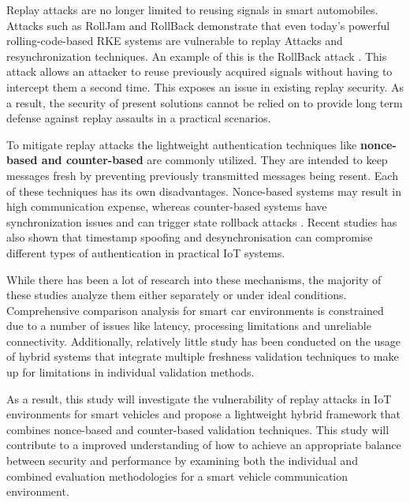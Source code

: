 \documentclass[a4paper,man,12pt]{article}
\begin{document}
Replay attacks are no longer limited to reusing signals in smart automobiles. Attacks such as RollJam and RollBack demonstrate that even today's powerful rolling-code-based RKE systems are vulnerable to replay Attacks and resynchronization techniques. An example of this is the RollBack attack \parencite{001B}. This attack allows an attacker to reuse previously acquired signals without having to intercept them a second time. This exposes an issue in existing replay security. As a result, the security of present solutions cannot be relied on to provide long term defense against replay assaults in a practical scenarios.\bigbreak

To mitigate replay attacks the lightweight authentication techniques like\textbf{ nonce-based and counter-based }are commonly utilized. They are intended to keep messages fresh by preventing previously transmitted messages being resent. Each of these techniques has its own disadvantages. Nonce-based systems may result in high communication expense, whereas counter-based systems have synchronization issues and can trigger state rollback attacks \parencite{new2}. Recent studies has also shown that timestamp spoofing and desynchronisation can compromise different types of authentication in practical IoT systems\parencite{001C}. \bigbreak

While there has been a lot of research into these mechanisms, the majority of these studies analyze them either separately or under ideal conditions. Comprehensive comparison analysis for smart car environments is constrained due to a number of issues like latency, processing limitations and unreliable connectivity. Additionally, relatively little study has been conducted on the usage of hybrid systems that integrate multiple freshness validation techniques to make up for limitations in individual validation methods.\bigbreak

As a result, this study will investigate the vulnerability of replay attacks in IoT environments for smart vehicles and propose a lightweight hybrid framework that combines nonce-based and counter-based validation techniques. This study will contribute to a improved understanding of how to achieve an appropriate balance between security and performance by examining both the individual and combined evaluation methodologies for a smart vehicle communication environment.



  
\end{document}

